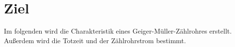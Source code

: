 \section{Ziel}
\label{sec:Ziel}

Im folgenden wird die Charakteristik eines Geiger-Müller-Zählrohres erstellt.
Außerdem wird die Totzeit und der Zählrohrstrom bestimmt.